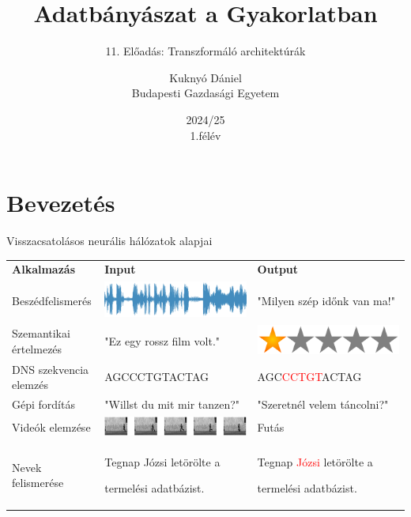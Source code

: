 \documentclass[english, aspectratio=169]{beamer}
\makeatletter
\newcommand\makebeamertitle{\frame{\maketitle}}
\let\origtableofcontents=\tableofcontents
\def\tableofcontents{\@ifnextchar[{\origtableofcontents}{\gobbletableofcontents}}
\def\gobbletableofcontents#1{\origtableofcontents}
\makeatother
\begin{document}
\section{Bevezetés}
\title[]{Adatbányászat a Gyakorlatban}
\subtitle{11. Előadás: Transzformáló architektúrák}
\author[Kuknyó Dániel]{Kuknyó Dániel\\Budapesti Gazdasági Egyetem}
\date{2024/25\\1.félév}
\makebeamertitle

\begin{frame}
\tableofcontents{}
\end{frame}

\begin{frame}
\tableofcontents[currentsection]
\end{frame}

\begin{frame}{Visszacsatolásos neurális hálózatok alapjai}
\renewcommand{\arraystretch}{2.}
\begin{tabularx}{\textwidth}{m{4cm}m{5cm}m{5cm}}
\textbf{Alkalmazás} & \textbf{Input} & \textbf{Output} \\
	Beszédfelismerés & \includegraphics[width=.25\textwidth, keepaspectratio]{../../10_recurrent/doc/images/recurrent_1.png} & "Milyen szép időnk van ma!" \\
	Szemantikai értelmezés & "Ez egy rossz film volt." & \includegraphics[width=.2\textwidth, keepaspectratio]{../../10_recurrent/doc/images/recurrent_2.png} \\
	DNS szekvencia elemzés & AGCCCTGTACTAG & AGC\textcolor{red}{CCTGT}ACTAG \\
	Gépi fordítás & "Willst du mit mir tanzen?" & "Szeretnél velem táncolni?" \\
	Videók elemzése & \includegraphics[width=.3\textwidth, keepaspectratio]{../../10_recurrent/doc/images/recurrent_3.png} & Futás \\
	Nevek felismerése & Tegnap Józsi letörölte a\par termelési adatbázist. & Tegnap
\textcolor{red}{Józsi} letörölte a\par termelési adatbázist. \\
\end{tabularx}
\end{frame}
\end{document}

